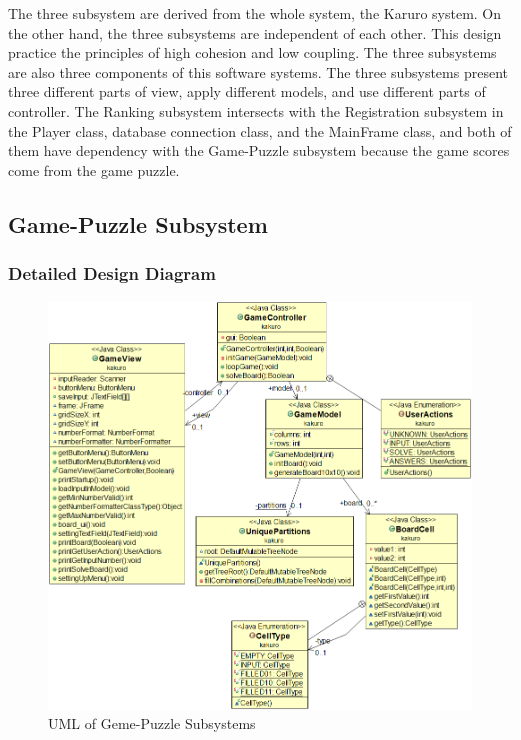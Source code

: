 \documentclass[12pt]{article}
\begin{document}
The three subsystem are derived from the whole system, the Karuro system. On the other hand, the three subsystems are independent of each other. This design practice the principles of high cohesion and low coupling. The three subsystems are also three components of this software systems. The three subsystems present three different parts of view, apply different models, and use different parts of controller. The Ranking subsystem intersects with the Registration subsystem in the Player class, database connection class, and the MainFrame class, and both of them have dependency with the Game-Puzzle subsystem because the game scores come from the game puzzle.

\newpage

\begin{landscape}

\subsection{Game-Puzzle Subsystem}

\subsubsection{Detailed Design Diagram}

\begin{figure}[htbp]
    \includegraphics[width=1.5\textwidth, height=.7\textheight]{images/GamePuzzle_UML}
    \caption{UML of Geme-Puzzle Subsystems}
    \label{fig:GamePuzzle_UML}
\end{figure}

\end{landscape}
\end{document}
